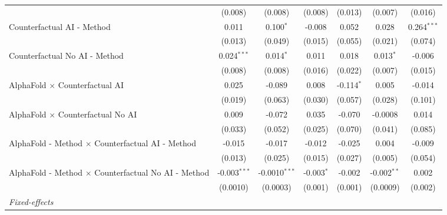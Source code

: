 \begin{tabular}{lcccccc}
                                                              & (0.008)        & (0.008)         & (0.008)       & (0.013)      & (0.007)       & (0.016)\\   
   Counterfactual AI - Method                                 & 0.011          & 0.100$^{*}$     & -0.008        & 0.052        & 0.028         & 0.264$^{***}$\\   
                                                              & (0.013)        & (0.049)         & (0.015)       & (0.055)      & (0.021)       & (0.074)\\   
   Counterfactual No AI - Method                              & 0.024$^{***}$  & 0.014$^{*}$     & 0.011         & 0.018        & 0.013$^{*}$   & -0.006\\   
                                                              & (0.008)        & (0.008)         & (0.016)       & (0.022)      & (0.007)       & (0.015)\\   
   AlphaFold $\times$ Counterfactual AI                       & 0.025          & -0.089          & 0.008         & -0.114$^{*}$ & 0.005         & -0.014\\   
                                                              & (0.019)        & (0.063)         & (0.030)       & (0.057)      & (0.028)       & (0.101)\\   
   AlphaFold $\times$ Counterfactual No AI                    & 0.009          & -0.072          & 0.035         & -0.070       & -0.0008       & 0.014\\   
                                                              & (0.033)        & (0.052)         & (0.025)       & (0.070)      & (0.041)       & (0.085)\\   
   AlphaFold - Method $\times$ Counterfactual AI - Method     & -0.015         & -0.017          & -0.012        & -0.025       & 0.004         & -0.009\\   
                                                              & (0.013)        & (0.025)         & (0.015)       & (0.027)      & (0.005)       & (0.054)\\   
   AlphaFold - Method $\times$ Counterfactual No AI - Method  & -0.003$^{***}$ & -0.0010$^{***}$ & -0.003$^{*}$  & -0.002       & -0.002$^{**}$ & 0.002\\   
                                                              & (0.0010)       & (0.0003)        & (0.001)       & (0.001)      & (0.0009)      & (0.002)\\   
   \midrule
   \emph{Fixed-effects}\\

\end{tabular}
